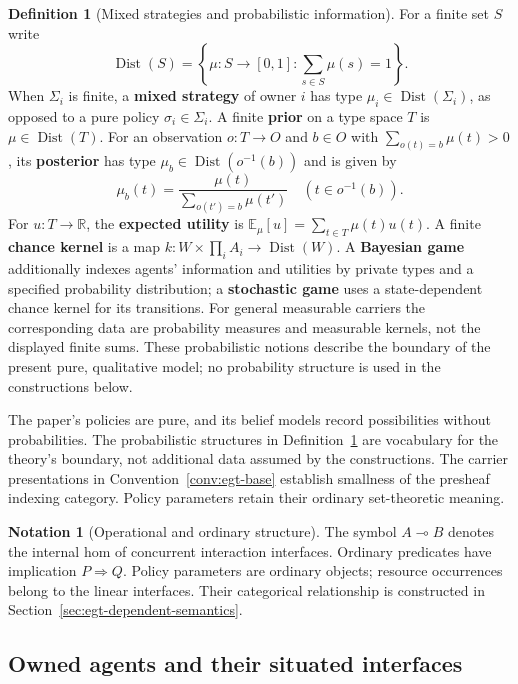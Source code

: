 \documentclass[11pt,a4paper]{article}
\numberwithin{equation}{section}
\theoremstyle{definition}
\newtheorem{definition}[theorem]{Definition}
\newtheorem{notation}[theorem]{Notation}
\theoremstyle{remark}
\theoremstyle{plain}
\begin{document}
\begin{definition}[Mixed strategies and probabilistic information]
\label{def:egt-probabilistic-vocabulary}
For a finite set $S$ write
\[
 \operatorname{Dist}(S)=
 \left\{\mu:S\to[0,1]:\sum_{s\in S}\mu(s)=1\right\}.
\]
When $\Sigma_i$ is finite, a \textbf{mixed strategy} of owner $i$
has type $\mu_i\in\operatorname{Dist}(\Sigma_i)$, as opposed
to a pure policy
$\sigma_i\in\Sigma_i$. A finite \textbf{prior} on a type space $T$
is $\mu\in\operatorname{Dist}(T)$. For an observation $o:T\to O$ and
$b\in O$ with $\sum_{o(t)=b}\mu(t)>0$, its \textbf{posterior} has type
$\mu_b\in\operatorname{Dist}(o^{-1}(b))$ and is given by
\[
 \mu_b(t)=\frac{\mu(t)}{\sum_{o(t')=b}\mu(t')}
 \quad(t\in o^{-1}(b)).
\]
For $u:T\to\mathbb R$, the \textbf{expected utility} is
$\mathbb E_\mu[u]=\sum_{t\in T}\mu(t)u(t)$. A finite
\textbf{chance kernel} is a map
$k:W\times\prod_iA_i\to\operatorname{Dist}(W)$.
A \textbf{Bayesian game} additionally indexes agents' information and
utilities by private types and a specified probability distribution;
a \textbf{stochastic game} uses a state-dependent chance kernel for its
transitions. For general measurable carriers the corresponding data are
probability measures and measurable kernels, not the displayed finite sums.
These probabilistic notions describe the boundary of the present pure,
qualitative model; no probability structure is used in the constructions
below.
\end{definition}
The paper's policies are pure, and its belief models record possibilities
without probabilities. The probabilistic structures in
Definition~\ref{def:egt-probabilistic-vocabulary} are vocabulary for the
theory's boundary, not additional data assumed by the constructions.
The carrier presentations in Convention~\ref{conv:egt-base} establish
smallness of the presheaf indexing category. Policy parameters retain their ordinary
set-theoretic meaning.



\begin{notation}[Operational and ordinary structure]
The symbol $A\multimap B$ denotes the internal hom of concurrent
interaction interfaces. Ordinary predicates have implication
$P\Rightarrow Q$. Policy parameters are ordinary objects; resource
occurrences belong to the linear interfaces. Their categorical relationship
is constructed in Section~\ref{sec:egt-dependent-semantics}.
\end{notation}

\subsection{Owned agents and their situated interfaces}
\label{sec:egt-agents}
\end{document}
